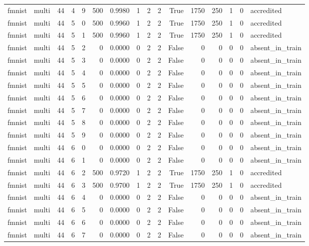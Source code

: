 \begin{tabular}{llrrrrrrrrrrrrrl}
fmnist & multi & 44 & 4 & 9 & 500 & 0.9980 & 1 & 2 & 2 & True & 1750 & 250 & 1 & 0 & accredited \\
fmnist & multi & 44 & 5 & 0 & 500 & 0.9960 & 1 & 2 & 2 & True & 1750 & 250 & 1 & 0 & accredited \\
fmnist & multi & 44 & 5 & 1 & 500 & 0.9960 & 1 & 2 & 2 & True & 1750 & 250 & 1 & 0 & accredited \\
fmnist & multi & 44 & 5 & 2 & 0 & 0.0000 & 0 & 2 & 2 & False & 0 & 0 & 0 & 0 & absent\_in\_train \\
fmnist & multi & 44 & 5 & 3 & 0 & 0.0000 & 0 & 2 & 2 & False & 0 & 0 & 0 & 0 & absent\_in\_train \\
fmnist & multi & 44 & 5 & 4 & 0 & 0.0000 & 0 & 2 & 2 & False & 0 & 0 & 0 & 0 & absent\_in\_train \\
fmnist & multi & 44 & 5 & 5 & 0 & 0.0000 & 0 & 2 & 2 & False & 0 & 0 & 0 & 0 & absent\_in\_train \\
fmnist & multi & 44 & 5 & 6 & 0 & 0.0000 & 0 & 2 & 2 & False & 0 & 0 & 0 & 0 & absent\_in\_train \\
fmnist & multi & 44 & 5 & 7 & 0 & 0.0000 & 0 & 2 & 2 & False & 0 & 0 & 0 & 0 & absent\_in\_train \\
fmnist & multi & 44 & 5 & 8 & 0 & 0.0000 & 0 & 2 & 2 & False & 0 & 0 & 0 & 0 & absent\_in\_train \\
fmnist & multi & 44 & 5 & 9 & 0 & 0.0000 & 0 & 2 & 2 & False & 0 & 0 & 0 & 0 & absent\_in\_train \\
fmnist & multi & 44 & 6 & 0 & 0 & 0.0000 & 0 & 2 & 2 & False & 0 & 0 & 0 & 0 & absent\_in\_train \\
fmnist & multi & 44 & 6 & 1 & 0 & 0.0000 & 0 & 2 & 2 & False & 0 & 0 & 0 & 0 & absent\_in\_train \\
fmnist & multi & 44 & 6 & 2 & 500 & 0.9720 & 1 & 2 & 2 & True & 1750 & 250 & 1 & 0 & accredited \\
fmnist & multi & 44 & 6 & 3 & 500 & 0.9700 & 1 & 2 & 2 & True & 1750 & 250 & 1 & 0 & accredited \\
fmnist & multi & 44 & 6 & 4 & 0 & 0.0000 & 0 & 2 & 2 & False & 0 & 0 & 0 & 0 & absent\_in\_train \\
fmnist & multi & 44 & 6 & 5 & 0 & 0.0000 & 0 & 2 & 2 & False & 0 & 0 & 0 & 0 & absent\_in\_train \\
fmnist & multi & 44 & 6 & 6 & 0 & 0.0000 & 0 & 2 & 2 & False & 0 & 0 & 0 & 0 & absent\_in\_train \\
fmnist & multi & 44 & 6 & 7 & 0 & 0.0000 & 0 & 2 & 2 & False & 0 & 0 & 0 & 0 & absent\_in\_train \\

\end{tabular}
